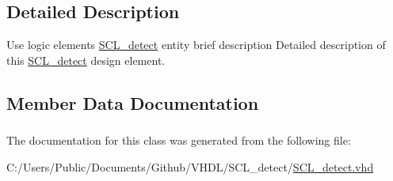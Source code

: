 \subsection{Detailed Description}
Use logic elements \hyperlink{class_s_c_l__detect}{S\+C\+L\+\_\+detect} entity brief description Detailed description of this \hyperlink{class_s_c_l__detect}{S\+C\+L\+\_\+detect} design element. 

\subsection{Member Data Documentation}
\subsubsection[{\texorpdfstring{I\+E\+EE}{IEEE}}]{\hspace{0.3cm}{\ttfamily [Library]}}\hypertarget{class_s_c_l__detect_ae4f03c286607f3181e16b9aa12d0c6d4}{}\label{class_s_c_l__detect_ae4f03c286607f3181e16b9aa12d0c6d4}
 

The documentation for this class was generated from the following file\+:\begin{DoxyCompactItemize}
\item 
C\+:/\+Users/\+Public/\+Documents/\+Github/\+V\+H\+D\+L/\+S\+C\+L\+\_\+detect/\hyperlink{_s_c_l__detect_8vhd}{S\+C\+L\+\_\+detect.\+vhd}\end{DoxyCompactItemize}
